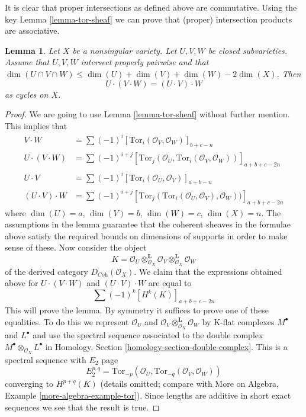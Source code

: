 \documentclass{stacks-project}
\theoremstyle{plain}
\newtheorem{lemma}[subsection]{Lemma}
\theoremstyle{definition}
\theoremstyle{remark}
\numberwithin{equation}{subsection}
\begin{document}
\noindent
It is clear that proper intersections as defined above are commutative.
Using the key Lemma \ref{lemma-tor-sheaf} we can prove that (proper)
intersection products are associative.

\begin{lemma}
\label{lemma-associative}
Let $X$ be a nonsingular variety. Let $U, V, W$ be closed
subvarieties. Assume that $U, V, W$ intersect properly pairwise
and that $\dim(U \cap V \cap W) \leq \dim(U) + \dim(V) + \dim(W) - 2\dim(X)$.
Then
$$
U \cdot (V \cdot W) = (U \cdot V) \cdot W
$$
as cycles on $X$.
\end{lemma}

\begin{proof}
We are going to use Lemma \ref{lemma-tor-sheaf} without further mention.
This implies that
\begin{align*}
V \cdot W
& =
\sum (-1)^i [\text{Tor}_i(\mathcal{O}_V, \mathcal{O}_W)]_{b + c - n} \\
U \cdot (V \cdot W)
& =
\sum (-1)^{i + j}
[
\text{Tor}_j(\mathcal{O}_U, \text{Tor}_i(\mathcal{O}_V, \mathcal{O}_W))
]_{a + b + c - 2n} \\
U \cdot V
& =
\sum (-1)^i [\text{Tor}_i(\mathcal{O}_U, \mathcal{O}_V)]_{a + b - n} \\
(U \cdot V) \cdot W
& =
\sum (-1)^{i + j}
[
\text{Tor}_j(\text{Tor}_i(\mathcal{O}_U, \mathcal{O}_V), \mathcal{O}_W))
]_{a + b + c - 2n}
\end{align*}
where $\dim(U) = a$, $\dim(V) = b$, $\dim(W) = c$, $\dim(X) = n$.
The assumptions in the lemma guarantee that the coherent sheaves
in the formulae above satisfy the required bounds on dimensions
of supports in order to make sense of these. Now consider the object
$$
K =
\mathcal{O}_U \otimes^\mathbf{L}_{\mathcal{O}_X} \mathcal{O}_V
\otimes^\mathbf{L}_{\mathcal{O}_X} \mathcal{O}_W
$$
of the derived category $D_{\textit{Coh}}(\mathcal{O}_X)$.
We claim that the expressions obtained above for
$U \cdot (V \cdot W)$ and $(U \cdot V) \cdot W$
are equal to
$$
\sum (-1)^k [H^k(K)]_{a + b + c - 2n}
$$
This will prove the lemma. By symmetry it suffices to prove one
of these equalities. To do this we represent $\mathcal{O}_U$
and $\mathcal{O}_V \otimes_{\mathcal{O}_X}^\mathbf{L} \mathcal{O}_W$
by K-flat complexes $M^\bullet$ and $L^\bullet$ and use the
spectral sequence associated to the double complex
$M^\bullet \otimes_{\mathcal{O}_X} L^\bullet$ in
Homology, Section \ref{homology-section-double-complex}.
This is a spectral sequence with $E_2$ page
$$
E_2^{p, q} =
\text{Tor}_{-p}(\mathcal{O}_U, \text{Tor}_{-q}(\mathcal{O}_V, \mathcal{O}_W))
$$
converging to $H^{p + q}(K)$ (details omitted; compare with
More on Algebra, Example \ref{more-algebra-example-tor}).
Since lengths are additive in short
exact sequences we see that the result is true.
\end{proof}
\end{document}
